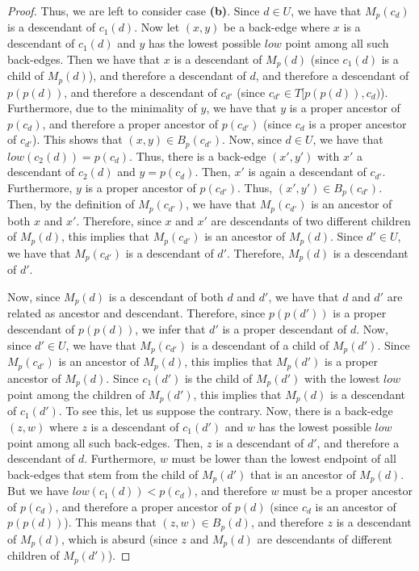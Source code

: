 \documentclass[11pt,a4paper]{article}
\begin{document}
\begin{proof}
Thus, we are left to consider case \textbf{(b)}. Since $d\in U$, we have that $M_p(c_d)$ is a descendant of $c_1(d)$. Now let $(x,y)$ be a back-edge where $x$ is a descendant of $c_1(d)$ and $y$ has the lowest possible $\mathit{low}$ point among all such back-edges. Then we have that $x$ is a descendant of $M_p(d)$ (since $c_1(d)$ is a child of $M_p(d)$), and therefore a descendant of $d$, and therefore a descendant of $p(p(d))$, and therefore a descendant of $c_{d'}$ (since $c_{d'}\in T[p(p(d)),c_d)$). Furthermore, due to the minimality of $y$, we have that $y$ is a proper ancestor of $p(c_d)$, and therefore a proper ancestor of $p(c_{d'})$ (since $c_d$ is a proper ancestor of $c_{d'}$). This shows that $(x,y)\in B_p(c_{d'})$. Now, since $d\in U$, we have that $\mathit{low}(c_2(d))=p(c_d)$. Thus, there is a back-edge $(x',y')$ with $x'$ a descendant of $c_2(d)$ and $y=p(c_d)$. Then, $x'$ is again a descendant of $c_{d'}$. Furthermore, $y$ is a proper ancestor of $p(c_{d'})$. Thus, $(x',y')\in B_p(c_{d'})$. Then, by the definition of $M_p(c_{d'})$, we have that $M_p(c_{d'})$ is an ancestor of both $x$ and $x'$. Therefore, since $x$ and $x'$ are descendants of two different children of $M_p(d)$, this implies that $M_p(c_{d'})$ is an ancestor of $M_p(d)$. Since $d'\in U$, we have that $M_p(c_{d'})$ is a descendant of $d'$. Therefore, $M_p(d)$ is a descendant of $d'$. 

Now, since $M_p(d)$ is a descendant of both $d$ and $d'$, we have that $d$ and $d'$ are related as ancestor and descendant. Therefore, since $p(p(d'))$ is a proper descendant of $p(p(d))$, we infer that $d'$ is a proper descendant of $d$. Now, since $d'\in U$, we have that $M_p(c_{d'})$ is a descendant of a child of $M_p(d')$. Since $M_p(c_{d'})$ is an ancestor of $M_p(d)$, this implies that $M_p(d')$ is a proper ancestor of $M_p(d)$. Since $c_1(d')$ is the child of $M_p(d')$ with the lowest $\mathit{low}$ point among the children of $M_p(d')$, this implies that $M_p(d)$ is a descendant of $c_1(d')$. To see this, let us suppose the contrary. Now, there is a back-edge $(z,w)$ where $z$ is a descendant of $c_1(d')$ and $w$ has the lowest possible $\mathit{low}$ point among all such back-edges. Then, $z$ is a descendant of $d'$, and therefore a descendant of $d$. Furthermore, $w$ must be lower than the lowest endpoint of all back-edges that stem from the child of $M_p(d')$ that is an ancestor of $M_p(d)$. But we have $\mathit{low}(c_1(d))<p(c_d)$, and therefore $w$ must be a proper ancestor of $p(c_d)$, and therefore a proper ancestor of $p(d)$ (since $c_d$ is an ancestor of $p(p(d))$). This means that $(z,w)\in B_p(d)$, and therefore $z$ is a descendant of $M_p(d)$, which is absurd (since $z$ and $M_p(d)$ are descendants of different children of $M_p(d')$). 


\end{proof}
\end{document}
